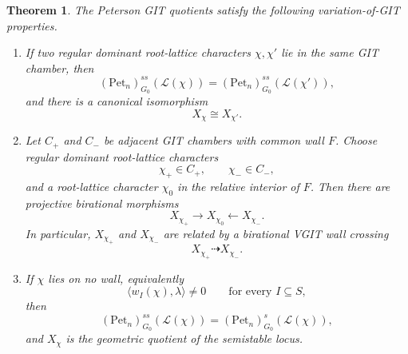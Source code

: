 \documentclass[12pt, reqno]{amsart}
\theoremstyle{plain}
\numberwithin{equation}{section}
\newtheorem{theorem}{Theorem}[section]
\theoremstyle{definition}
\begin{document}
\begin{theorem}\label{thm:peterson-vgit}
The Peterson GIT quotients satisfy the following variation-of-GIT
properties.

\begin{enumerate}
\item
If two regular dominant root-lattice characters
\(\chi,\chi'\) lie in the same GIT chamber, then
\[
(\mathrm{Pet}_n)^{ss}_{G_0}(\mathcal L(\chi))
=
(\mathrm{Pet}_n)^{ss}_{G_0}(\mathcal L(\chi')),
\]
and there is a canonical isomorphism
\[
X_\chi\cong X_{\chi'}.
\]

\item
Let \(C_+\) and \(C_-\) be adjacent GIT chambers with common wall
\(F\). Choose regular dominant root-lattice characters
\[
\chi_+\in C_+,\qquad
\chi_-\in C_-,
\]
and a root-lattice character \(\chi_0\) in the relative interior of
\(F\). Then there are projective birational morphisms
\[
X_{\chi_+}\longrightarrow X_{\chi_0}
\longleftarrow X_{\chi_-}.
\]
In particular, \(X_{\chi_+}\) and \(X_{\chi_-}\) are related by a
birational VGIT wall crossing
\[
X_{\chi_+}\dashrightarrow X_{\chi_-}.
\]

\item
If \(\chi\) lies on no wall, equivalently
\[
\langle w_I(\chi),\lambda\rangle\neq0
\qquad
\text{for every }I\subseteq S,
\]
then
\[
(\mathrm{Pet}_n)^{ss}_{G_0}(\mathcal L(\chi))
=
(\mathrm{Pet}_n)^s_{G_0}(\mathcal L(\chi)),
\]
and \(X_\chi\) is the geometric quotient of the semistable locus.
\end{enumerate}
\end{theorem}
\end{document}
